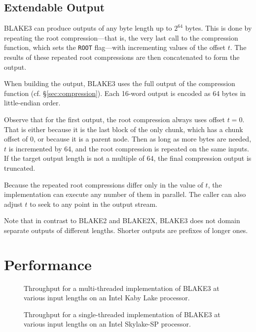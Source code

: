 \documentclass[12pt,notitlepage,a4paper]{article}
\begin{document}
\subsection{Extendable Output}\label{sec:extendable}

BLAKE3 can produce outputs of any byte length up to $2^{64}$ bytes. 
This is done by repeating the root compression---that is, the very last 
call to the compression function, which sets the \texttt{ROOT} flag---with 
incrementing values of the offset $t$. The results of these repeated root 
compressions are then concatenated to form the output.

When building the output, BLAKE3 uses the full output of the
compression function (cf. \S\ref{sec:compression}). Each 16-word output is
encoded as 64 bytes in little-endian order.

Observe that for the first output, the root compression always uses offset $t
= 0$. That is either because it is the last block of the only chunk, which has
a chunk offset of $0$, or because it is a parent node. Then as long as more 
bytes are needed, $t$ is incremented by 64, and the root compression is 
repeated on the same inputs. If the target output length is not a multiple of 64, 
the final compression output is truncated.

Because the repeated root compressions differ only in the value of $t$, the
implementation can execute any number of them in parallel. The caller can also
adjust $t$ to seek to any point in the output stream.

Note that in contrast to BLAKE2 and BLAKE2X, BLAKE3 does not domain separate
outputs of different lengths. Shorter outputs are prefixes of longer ones.

\section{Performance}\label{sec:performance}

\begin{figure}[h]
\centering
%

\caption{Throughput for a multi-threaded implementation of BLAKE3 at various
    input lengths on an Intel Kaby Lake processor.}
\label{fig:avx2_rayon}
\end{figure}

\begin{figure}[h]
\centering
%

\caption{Throughput for a single-threaded implementation of BLAKE3 at various
    input lengths on an Intel Skylake-SP processor.}%
\label{fig:avx512_c}
\end{figure}
\end{document}

